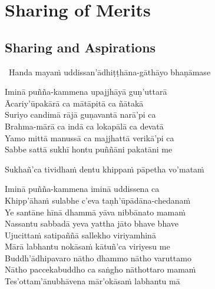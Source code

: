 
\ifdigital
\fi

\ifninebythirteen
\fi

\ifbfive
\fi

\chapter{Sharing of Merits}

\ifbfive
\fi

\ifninebythirteen
  \fi



\begingroup
\setsechook{%
  \clearpage%
  \setsecnumformat{}%
}

\setsecheadstyle{\sectionFmt}

\section{Sharing and Aspirations}
\label{uddissanadhitthana}

\begin{leader}
  \anglebracketleft\ \hspace{-0.5mm}Handa mayaṁ uddissan'ādhiṭṭhāna-gāthāyo \mbox{bhaṇāmase}~\hspace{-0.5mm}\anglebracketright\
\end{leader}

Iminā puñña-kammena upajjhāyā guṇ'uttarā\\
Ācariy'ūpakārā ca mātāpitā ca ñātakā\\
Suriyo candimā rājā guṇavantā narā'pi ca\\
Brahma-mārā ca indā ca lokapālā ca devatā\\
Yamo mittā manussā ca majjhattā verikā'pi ca\\
Sabbe sattā sukhī hontu puññāni pakatāni me\\
\begin{pali-hang-together}
Sukhañ'ca tividhaṁ dentu khippaṁ pāpetha vo'mataṁ\\
\end{pali-hang-together}
Iminā puñña-kammena iminā uddissena ca\\
Khipp'āhaṁ sulabhe c'eva taṇh'ūpādāna-chedanaṁ\\
Ye santāne hīnā dhammā yāva nibbānato mamaṁ\\
Nassantu sabbadā yeva yattha jāto bhave bhave\\
Ujucittaṁ satipaññā sallekho viriyamhinā\\
Mārā labhantu nokāsaṁ kātuñ'ca viriyesu me\\
Buddh'ādhipavaro nātho dhammo nātho varuttamo\\
Nātho paccekabuddho ca saṅgho nāthottaro mamaṁ\\
Tes'ottam'ānubhāvena mār'okāsaṁ labhantu mā


